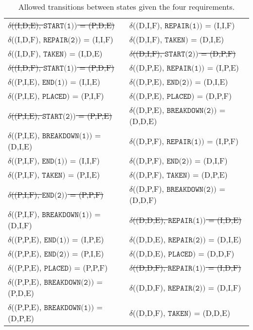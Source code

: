 \begin{table}[H]
\begin{tabular}{ll}
    \sout{$\delta$((I,D,E), $\texttt{START(1)})$ = (P,D,E)}     & $\delta$((D,I,F), $\texttt{REPAIR(1)})$ = (I,I,F)     \\
    $\delta$((I,D,F), $\texttt{REPAIR(2)})$ = (I,I,F)    & $\delta$((D,I,F), $\texttt{TAKEN})$ = (D,I,E)         \\
    $\delta$((I,D,F), $\texttt{TAKEN})$ = (I,D,E)        & \sout{$\delta$((D,I,F), $\texttt{START(2)})$ = (D,P,F)}      \\
    \sout{$\delta$((I,D,F), $\texttt{START(1)})$ = (P,D,F)}     & $\delta$((D,P,E), $\texttt{REPAIR(1)})$ = (I,P,E)     \\
    $\delta$((P,I,E), $\texttt{END(1)})$ = (I,I,E)       & $\delta$((D,P,E), $\texttt{END(2)})$ = (D,I,E)        \\
    $\delta$((P,I,E), $\texttt{PLACED})$ = (P,I,F)       & $\delta$((D,P,E), $\texttt{PLACED})$ = (D,P,F)        \\
    \sout{$\delta$((P,I,E), $\texttt{START(2)})$ = (P,P,E)}     & $\delta$((D,P,E), $\texttt{BREAKDOWN(2)})$ = (D,D,E)  \\
    $\delta$((P,I,E), $\texttt{BREAKDOWN(1)})$ = (D,I,E) & $\delta$((D,P,F), $\texttt{REPAIR(1)})$ = (I,P,F)     \\
    $\delta$((P,I,F), $\texttt{END(1)})$ = (I,I,F)       & $\delta$((D,P,F), $\texttt{END(2)})$ = (D,I,F)        \\
    $\delta$((P,I,F), $\texttt{TAKEN})$ = (P,I,E)        & $\delta$((D,P,F), $\texttt{TAKEN})$ = (D,P,E)         \\
    \sout{$\delta$((P,I,F), $\texttt{END(2)})$ = (P,P,F)}       & $\delta$((D,P,F), $\texttt{BREAKDOWN(2)})$ = (D,D,F)  \\
    $\delta$((P,I,F), $\texttt{BREAKDOWN(1)})$ = (D,I,F) & \sout{$\delta$((D,D,E), $\texttt{REPAIR(1)})$ = (I,D,E)}     \\
    $\delta$((P,P,E), $\texttt{END(1)})$ = (I,P,E)       & $\delta$((D,D,E), $\texttt{REPAIR(2)})$ = (D,I,E)     \\
    $\delta$((P,P,E), $\texttt{END(2)})$ = (P,I,E)       & $\delta$((D,D,E), $\texttt{PLACED})$ = (D,D,F)        \\
    $\delta$((P,P,E), $\texttt{PLACED})$ = (P,P,F)       & \sout{$\delta$((D,D,F), $\texttt{REPAIR(1)})$ = (I,D,F)}     \\
    $\delta$((P,P,E), $\texttt{BREAKDOWN(2)})$ = (P,D,E) & $\delta$((D,D,F), $\texttt{REPAIR(2)})$ = (D,I,F)     \\
    $\delta$((P,P,E), $\texttt{BREAKDOWN(1)})$ = (D,P,E) & $\delta$((D,D,F), $\texttt{TAKEN})$ = (D,D,E)         \\
  \end{tabular}
  \caption{Allowed transitions between states given the four requirements.}
  \label{tbl:04.03_delta}
\end{table}

